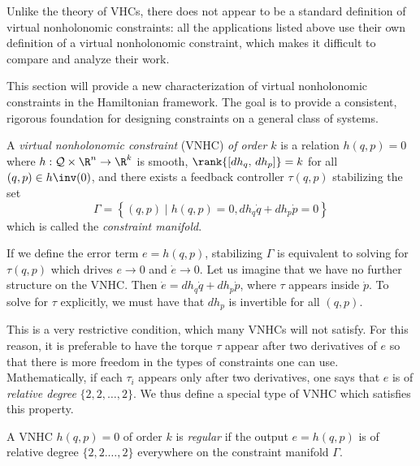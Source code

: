 Unlike the theory of VHCs, there does not appear to be a standard definition of virtual
nonholonomic constraints: 
all the applications listed above use their own definition of a virtual
nonholonomic constraint, which makes it difficult to compare and analyze their
work. 

This section will provide a new characterization of virtual nonholonomic
constraints in the Hamiltonian framework. 
The goal is to provide a consistent, rigorous foundation for
designing constraints on a general class of systems.

\begin{defn}
    A \textit{virtual nonholonomic constraint} (VNHC) \textit{of order \(k\)} is a
    relation \(h(q,p) = 0\) where \(h : \mathcal{Q}\times\R^n \rightarrow \R^k\) is
    smooth, \(\rank{\left[ dh_q,\, dh_p \right]} = k\) for all 
    \((q,p) \in h\inv(0)\), and there exists a feedback controller \(\tau(q,p)\)
    stabilizing the set
    \[
        \Gamma = \left\{(q,p) \mid h(q,p) = 0, dh_q \dot{q} + dh_p \dot{p} = 0\right\}
    \]
    which is called the \textit{constraint manifold}.
\end{defn}

If we define the error term  \(e = h(q,p)\), stabilizing \(\Gamma\) is
equivalent to solving for \(\tau(q,p)\) which drives \(e \rightarrow 0\) and
\(\dot{e} \rightarrow 0\).
Let us imagine that we have no further structure on the VNHC. 
Then \(\dot{e} = dh_q \dot{q} + dh_p \dot{p}\), where \(\tau\) appears inside
\(\dot{p}\). To solve for \(\tau\) explicitly, we must have that \(dh_p\) is
invertible for all \((q,p)\).

This is a very restrictive condition, which many VNHCs will not satisfy. For
this reason, it is preferable to have the torque \(\tau\) appear after two 
derivatives of \(e\) so that there is more freedom in the types of constraints
one can use.
Mathematically, if each \(\tau_i\) appears only after two derivatives, one says 
that \(e\) is of \textit{relative degree} \(\{2,2,\ldots,2\}\). 
We thus define a special type of VNHC which satisfies this
property.

\begin{defn}
    A VNHC \(h(q,p) = 0\) of order \(k\) is \textit{regular} if the output 
    \(e = h(q,p)\) is of relative degree \(\{2,2.\ldots,2\}\) everywhere on the
    constraint manifold \(\Gamma\).
\end{defn}

